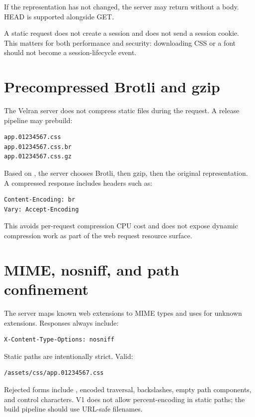 If the representation has not changed, the server may return  without a body. HEAD is supported alongside GET.

A static request does not create a session and does not send a session cookie. This matters for both performance and security: downloading CSS or a font should not become a session-lifecycle event.

\section{Precompressed Brotli and gzip}

The Velran server does not compress static files during the request. A release pipeline may prebuild:

\begin{lstlisting}
app.01234567.css
app.01234567.css.br
app.01234567.css.gz
\end{lstlisting}

Based on , the server chooses Brotli, then gzip, then the original representation. A compressed response includes headers such as:

\begin{lstlisting}
Content-Encoding: br
Vary: Accept-Encoding
\end{lstlisting}

This avoids per-request compression CPU cost and does not expose dynamic compression work as part of the web request resource surface.

\section{MIME, nosniff, and path confinement}

The server maps known web extensions to MIME types and uses  for unknown extensions. Responses always include:

\begin{lstlisting}
X-Content-Type-Options: nosniff
\end{lstlisting}

Static paths are intentionally strict. Valid:

\begin{lstlisting}
/assets/css/app.01234567.css
\end{lstlisting}

Rejected forms include , encoded traversal, backslashes, empty path components, and control characters. V1 does not allow percent-encoding in static paths; the build pipeline should use URL-safe filenames.

